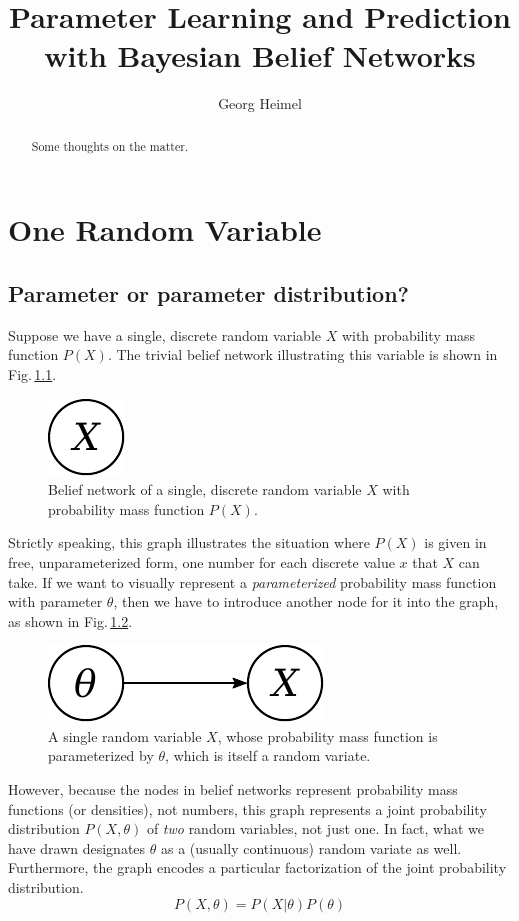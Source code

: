 \documentclass[]{report}
\title{Parameter Learning and Prediction with Bayesian Belief Networks}
\author{Georg Heimel}
\begin{document}
\maketitle

\begin{abstract}
Some thoughts on the matter.
\end{abstract}

\chapter{One Random Variable} \label{chap:1var}
\section{Parameter or parameter distribution?} \label{sect:set_param}
Suppose we have a single, discrete random variable $X$ with probability mass function $P(X)$. The trivial belief network illustrating this variable is shown in Fig.\,\ref{fig:1var}.
\begin{figure}[h]
	\centering
	\includegraphics[scale=0.5]{1var}
	\caption{Belief network of a single, discrete random variable $X$ with probability mass function $P(X)$.}
	\label{fig:1var}
\end{figure}
Strictly speaking, this graph illustrates the situation where $P(X)$ is given in free, unparameterized form, one number for each discrete value $x$ that $X$ can take. If we want to visually represent a \emph{parameterized} probability mass function with parameter $\theta$, then we have to introduce another node for it into the graph, as shown in Fig.\,\ref{fig:1var1param}.
\begin{figure}[h]
	\centering
	\includegraphics[scale=0.5]{1var_1param}
	\caption{A single random variable $X$, whose probability mass function is parameterized by $\theta$, which is itself a random variate.}
	\label{fig:1var1param}
\end{figure}
However, because the nodes in belief networks represent probability mass functions (or densities), not numbers, this graph represents a joint probability distribution $P(X, \theta)$ of \emph{two} random variables, not just one. In fact, what we have drawn designates $\theta$ as a (usually continuous) random variate as well. Furthermore, the graph encodes a particular factorization of the joint probability distribution.
\begin{equation}
P(X, \theta) = P(X|\theta)P(\theta)
\end{equation}
\end{document}

